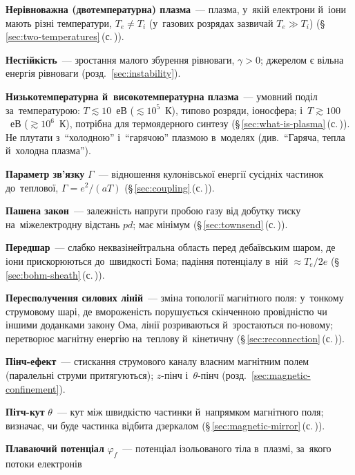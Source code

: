 	\item \textbf{Нерівноважна (двотемпературна) плазма}~--- плазма, у~якій електрони й~іони мають різні
	  температури, $T_e\neq T_i$ (у~газових розрядах зазвичай $T_e\gg T_i$) (§\,\ref{sec:two-temperatures}\,(с.\,\pageref{sec:two-temperatures})).
	\item \textbf{Нестійкість}~--- зростання малого збурення рівноваги, $\gamma>0$; джерелом є вільна енергія рівноваги (розд.~\ref{sec:instability}).
	\item \textbf{Низькотемпературна й~високотемпературна плазма}~--- умовний поділ за~температурою:
	  $T\lesssim10$~еВ ($\lesssim10^5$~К), типово розряди, іоносфера; і~$T\gtrsim100$~еВ ($\gtrsim10^6$~К),
	  потрібна для термоядерного синтезу (§\,\ref{sec:what-is-plasma}\,(с.\,\pageref{sec:what-is-plasma})). Не плутати з~\enquote{холодною}
	  і~\enquote{гарячою} плазмою в~моделях (див.\ \enquote{Гаряча, тепла й~холодна плазма}).
	\item \textbf{Параметр зв'язку} $\Gamma$~--- відношення кулонівської енергії сусідніх частинок до~теплової,
	  $\Gamma=e^2/(aT)$ (§\,\ref{sec:coupling}\,(с.\,\pageref{sec:coupling})).
	\item \textbf{Пашена закон}~--- залежність напруги пробою газу від добутку тиску на~міжелектродну відстань $pd$; має мінімум (§\,\ref{sec:townsend}\,(с.\,\pageref{sec:townsend})).
	\item \textbf{Передшар}~--- слабко неквазінейтральна область перед дебаївським шаром, де іони прискорюються до~швидкості Бома;
	  падіння потенціалу в~ній $\approx T_e/2e$ (§\,\ref{sec:bohm-sheath}\,(с.\,\pageref{sec:bohm-sheath})).
	\item \textbf{Пересполучення силових ліній}~--- зміна топології магнітного поля: у~тонкому струмовому шарі, де вмороженість порушується скінченною провідністю чи іншими доданками закону Ома, лінії розриваються й~зростаються по-новому; перетворює магнітну енергію на~теплову й~кінетичну (§\,\ref{sec:reconnection}\,(с.\,\pageref{sec:reconnection})).
	\item \textbf{Пінч-ефект}~--- стискання струмового каналу власним магнітним полем (паралельні струми притягуються); $z$-пінч і~$\theta$-пінч (розд.~\ref{sec:magnetic-confinement}).
	\item \textbf{Пітч-кут} $\theta$~--- кут між швидкістю частинки й~напрямком магнітного поля; визначає, чи буде частинка відбита дзеркалом (§\,\ref{sec:magnetic-mirror}\,(с.\,\pageref{sec:magnetic-mirror})).
	\item \textbf{Плаваючий потенціал} $\varphi_f$~--- потенціал ізольованого тіла в~плазмі, за~якого потоки електронів
